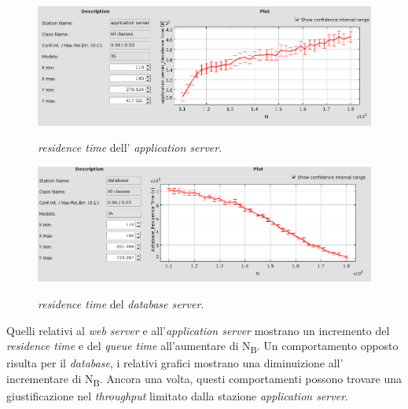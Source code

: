 \documentclass[../main.tex]{subfiles}
\begin{document}
    \begin{figure}[H]
        \centering
        \includegraphics[scale = 0.5]{assets/residence_as.png}\\
        \caption[\textit{Residence time} dell' \textit{application server}]{\textit{residence time} dell' \textit{application server}.}
        \label{fig:residence-time-as}
    \end{figure}

    \begin{figure}[H]
        \centering
        \includegraphics[scale = 0.5]{assets/residence_db.png}\\
        \caption[\textit{Residence time} del \textit{database server}]{\textit{residence time} del \textit{database server}.}
        \label{fig:residence-time-db}
    \end{figure}
    Quelli relativi al \textit{web server} e all'\textit{application server} mostrano un incremento del
    \textit{residence time} e del \textit{queue time} all'aumentare di N\textsubscript{B}.
    Un comportamento opposto risulta per il \textit{database}, i relativi grafici mostrano una diminuizione all'
    incrementare di N\textsubscript{B}.
    Ancora una volta, questi comportamenti possono trovare una giustificazione nel \textit{throughput} limitato dalla
    stazione \textit{application server}.
\end{document}
